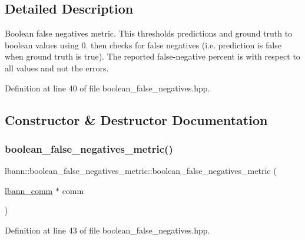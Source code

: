 \subsection{Detailed Description}
Boolean false negatives metric. This thresholds predictions and ground truth to boolean values using 0. then checks for false negatives (i.\+e. prediction is false when ground truth is true). The reported false-\/negative percent is with respect to all values and not the errors. 

Definition at line 40 of file boolean\+\_\+false\+\_\+negatives.\+hpp.



\subsection{Constructor \& Destructor Documentation}
\mbox{\label{classlbann_1_1boolean__false__negatives__metric_abb7220421c393713e5a79a3da3b4b79c}} 
\subsubsection{\texorpdfstring{boolean\+\_\+false\+\_\+negatives\+\_\+metric()}{boolean\_false\_negatives\_metric()}\hspace{0.1cm}{\footnotesize\ttfamily [1/2]}}
{\footnotesize\ttfamily lbann\+::boolean\+\_\+false\+\_\+negatives\+\_\+metric\+::boolean\+\_\+false\+\_\+negatives\+\_\+metric (\begin{DoxyParamCaption}\item[{\hyperlink{classlbann_1_1lbann__comm}{lbann\+\_\+comm} $\ast$}]{comm }\end{DoxyParamCaption})\hspace{0.3cm}{\ttfamily [inline]}}



Definition at line 43 of file boolean\+\_\+false\+\_\+negatives.\+hpp.


